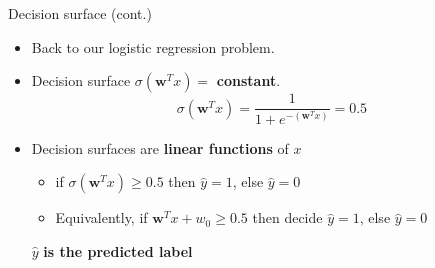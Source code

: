 \documentclass[serif, aspectratio=169]{beamer}
\begin{document}
\begin{frame}{Decision surface (cont.)}
    \begin{itemize}
      \item Back to our logistic regression problem.
      \item Decision surface $\sigma (\mathbf{w}^Tx) = $ \textbf{constant}.
        \[
            \sigma (\mathbf{w}^Tx) = \frac{1}{1 + e^{-(\mathbf{w}^Tx)}} = 0.5
        \]
      \item Decision surfaces are \textbf{linear functions} of $x$
        \begin{itemize}
            \item if $\sigma (\mathbf{w}^Tx) \geq 0.5$ then $\hat{y}=1$, else $\hat{y} = 0$
            \item Equivalently, if $\mathbf{w}^Tx + w_0 \geq 0.5$ then decide $\hat{y}=1$, else $\hat{y}=0$
        \end{itemize}%
        \vfill
        \begin{center}
            \( \hat{y} \) \textbf{is the predicted label}
        \end{center}
    \end{itemize}
\end{frame}
\end{document}

